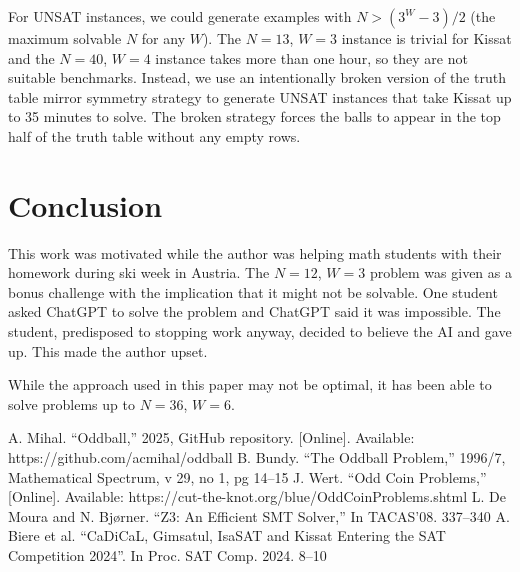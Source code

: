 \documentclass[conference]{IEEEtran}
\begin{document}
For UNSAT instances, we could generate examples with $N > (3^W - 3) / 2$ (the maximum solvable $N$ for any $W$).
The $N=13$, $W=3$ instance is trivial for Kissat and the $N=40$, $W=4$ instance takes more than one hour, so they are not suitable
benchmarks.
Instead, we use an intentionally broken version of the truth table mirror symmetry strategy to generate UNSAT instances that take
Kissat up to 35 minutes to solve.
The broken strategy forces the balls to appear in the top half of the truth table without any empty rows.

\section{Conclusion}

This work was motivated while the author was helping math students with their homework during ski week in Austria.
The $N=12$, $W=3$ problem was given as a bonus challenge with the implication that it might not be solvable.
One student asked ChatGPT to solve the problem and ChatGPT said it was impossible.
The student, predisposed to stopping work anyway, decided to believe the AI and gave up.
This made the author upset.

While the approach used in this paper may not be optimal, it has been able to solve problems up to $N=36$, $W=6$.

\begin{thebibliography}{0}
 A. Mihal. ``Oddball,'' 2025, GitHub repository. [Online]. Available: https://github.com/acmihal/oddball
 B. Bundy. ``The Oddball Problem,'' 1996/7, Mathematical Spectrum, v 29, no 1, pg 14--15
 J. Wert. ``Odd Coin Problems,'' [Online]. Available: https://cut-the-knot.org/blue/OddCoinProblems.shtml
 L. De Moura and N. Bj{\o}rner. ``Z3: An Efficient SMT Solver,'' In TACAS'08. 337--340
 A. Biere et al. ``CaDiCaL, Gimsatul, IsaSAT and Kissat Entering the SAT Competition 2024''. In Proc. SAT Comp. 2024. 8--10
\end{thebibliography}
\end{document}
